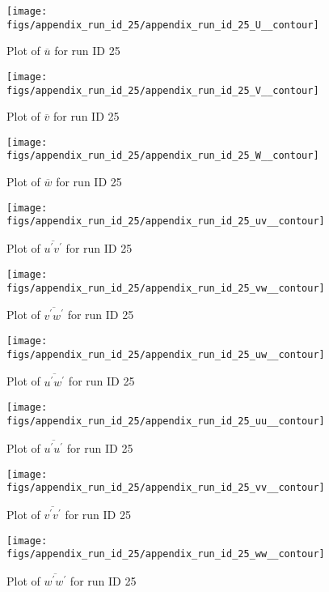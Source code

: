 \begin{figure}[H]
\centering
\texttt{[image: figs/appendix\_run\_id\_25/appendix\_run\_id\_25\_U\_\_contour]}
\caption{Plot of $\overline{u}$ for run ID 25}
\label{fig:appendix_run_id_25_U__contour}
\end{figure}


\begin{figure}[H]
\centering
\texttt{[image: figs/appendix\_run\_id\_25/appendix\_run\_id\_25\_V\_\_contour]}
\caption{Plot of $\overline{v}$ for run ID 25}
\label{fig:appendix_run_id_25_V__contour}
\end{figure}


\begin{figure}[H]
\centering
\texttt{[image: figs/appendix\_run\_id\_25/appendix\_run\_id\_25\_W\_\_contour]}
\caption{Plot of $\overline{w}$ for run ID 25}
\label{fig:appendix_run_id_25_W__contour}
\end{figure}


\begin{figure}[H]
\centering
\texttt{[image: figs/appendix\_run\_id\_25/appendix\_run\_id\_25\_uv\_\_contour]}
\caption{Plot of $\overline{u^\prime v^\prime}$ for run ID 25}
\label{fig:appendix_run_id_25_uv__contour}
\end{figure}


\begin{figure}[H]
\centering
\texttt{[image: figs/appendix\_run\_id\_25/appendix\_run\_id\_25\_vw\_\_contour]}
\caption{Plot of $\overline{v^\prime w^\prime}$ for run ID 25}
\label{fig:appendix_run_id_25_vw__contour}
\end{figure}


\begin{figure}[H]
\centering
\texttt{[image: figs/appendix\_run\_id\_25/appendix\_run\_id\_25\_uw\_\_contour]}
\caption{Plot of $\overline{u^\prime w^\prime}$ for run ID 25}
\label{fig:appendix_run_id_25_uw__contour}
\end{figure}


\begin{figure}[H]
\centering
\texttt{[image: figs/appendix\_run\_id\_25/appendix\_run\_id\_25\_uu\_\_contour]}
\caption{Plot of $\overline{u^\prime u^\prime}$ for run ID 25}
\label{fig:appendix_run_id_25_uu__contour}
\end{figure}


\begin{figure}[H]
\centering
\texttt{[image: figs/appendix\_run\_id\_25/appendix\_run\_id\_25\_vv\_\_contour]}
\caption{Plot of $\overline{v^\prime v^\prime}$ for run ID 25}
\label{fig:appendix_run_id_25_vv__contour}
\end{figure}


\begin{figure}[H]
\centering
\texttt{[image: figs/appendix\_run\_id\_25/appendix\_run\_id\_25\_ww\_\_contour]}
\caption{Plot of $\overline{w^\prime w^\prime}$ for run ID 25}
\label{fig:appendix_run_id_25_ww__contour}
\end{figure}


